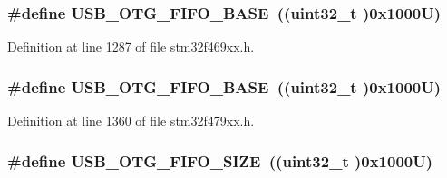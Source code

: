 \subsubsection[{\texorpdfstring{U\+S\+B\+\_\+\+O\+T\+G\+\_\+\+F\+I\+F\+O\+\_\+\+B\+A\+SE}{USB_OTG_FIFO_BASE}}]{\setlength{\rightskip}{0pt plus 5cm}\#define U\+S\+B\+\_\+\+O\+T\+G\+\_\+\+F\+I\+F\+O\+\_\+\+B\+A\+SE~((uint32\+\_\+t )0x1000\+U)}\hypertarget{group___peripheral__memory__map_gace340350802904868673f0e839c4fa04}{}\label{group___peripheral__memory__map_gace340350802904868673f0e839c4fa04}


Definition at line 1287 of file stm32f469xx.\+h.

\subsubsection[{\texorpdfstring{U\+S\+B\+\_\+\+O\+T\+G\+\_\+\+F\+I\+F\+O\+\_\+\+B\+A\+SE}{USB_OTG_FIFO_BASE}}]{\setlength{\rightskip}{0pt plus 5cm}\#define U\+S\+B\+\_\+\+O\+T\+G\+\_\+\+F\+I\+F\+O\+\_\+\+B\+A\+SE~((uint32\+\_\+t )0x1000\+U)}\hypertarget{group___peripheral__memory__map_gace340350802904868673f0e839c4fa04}{}\label{group___peripheral__memory__map_gace340350802904868673f0e839c4fa04}


Definition at line 1360 of file stm32f479xx.\+h.

\subsubsection[{\texorpdfstring{U\+S\+B\+\_\+\+O\+T\+G\+\_\+\+F\+I\+F\+O\+\_\+\+S\+I\+ZE}{USB_OTG_FIFO_SIZE}}]{\setlength{\rightskip}{0pt plus 5cm}\#define U\+S\+B\+\_\+\+O\+T\+G\+\_\+\+F\+I\+F\+O\+\_\+\+S\+I\+ZE~((uint32\+\_\+t )0x1000\+U)}\hypertarget{group___peripheral__memory__map_ga8781c4b2406c740d9fe540737a6a0188}{}\label{group___peripheral__memory__map_ga8781c4b2406c740d9fe540737a6a0188}



